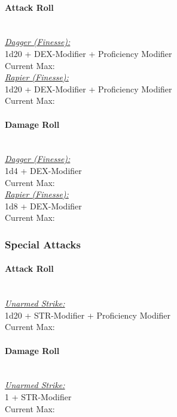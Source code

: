 \documentclass[letterpaper,openany,oneside,twocolumn]{book}
\begin{document}
\paragraph*{Attack Roll}\hfill\\
\underline{\textit{Dagger (Finesse):}}\\
1d20 + DEX-Modifier + Proficiency Modifier\\
\indent Current Max: 
\\
\underline{\textit{Rapier (Finesse):}}\\
1d20 + DEX-Modifier + Proficiency Modifier\\
\indent Current Max: 
\paragraph*{Damage Roll}\hfill\\
\underline{\textit{Dagger (Finesse):}}\\
1d4 + DEX-Modifier\\
\indent Current Max: 
\\
\underline{\textit{Rapier (Finesse):}}\\
1d8 + DEX-Modifier\\
\indent Current Max: 
\subsubsection*{Special Attacks}
\paragraph*{Attack Roll}\hfill\\
\underline{\textit{Unarmed Strike:}}\\
1d20 + STR-Modifier + Proficiency Modifier\\
\indent Current Max: 
\paragraph*{Damage Roll}\hfill\\
\underline{\textit{Unarmed Strike:}}\\
1 + STR-Modifier\\
\indent Current Max: 
\end{document}
